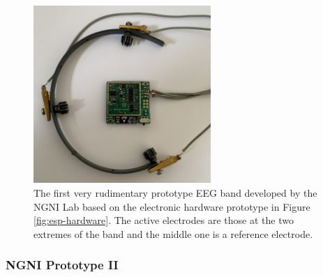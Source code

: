 \begin{figure}
    \centering
    \includegraphics[width=0.6\textwidth]{frankenstein}
    \caption[A very rudimentary first prototype EEG band]{The first very rudimentary prototype EEG band developed by the NGNI Lab based on the electronic hardware prototype in Figure \ref{fig:esp-hardware}. The active electrodes are those at the two extremes of the band and the middle one is a reference electrode.}
    \label{fig:frakenstein-hardware}
\end{figure}

\subsubsection{NGNI Prototype II}


